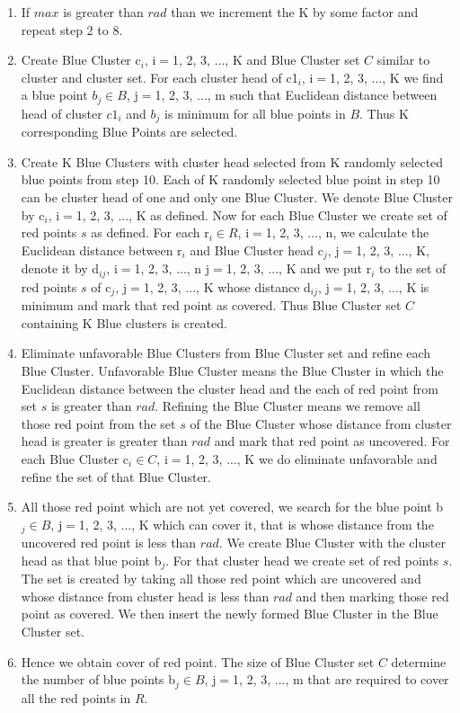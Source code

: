 \documentclass[12pt,a4wide]{report}
\theoremstyle{plain}
\theoremstyle{definition}
\theoremstyle{remark}
\begin{document}
\begin{enumerate}
 \item If $max$ is greater than $rad$ than we increment the K by some factor and repeat step 2 to 8.
 
 \item Create Blue Cluster c$_{i}$, i$=$1, 2, 3, ..., K and Blue Cluster set $C$ similar to cluster and cluster set. For each cluster head 
 of c1$_{i}$, i$=$1, 2, 3, ..., K we find a blue point $b_{j} \in B $, j$=$1, 2, 3, ..., m such that Euclidean distance between head of 
  cluster $c1_{i}$ and $b_{j}$ is minimum for all blue points in $B$. Thus K corresponding  Blue Points are selected.
  
 \item Create K Blue Clusters with cluster head selected from K randomly selected blue points from step 10. Each of K randomly selected blue point 
  in step 10 can be cluster head of one and only one Blue Cluster. We denote Blue Cluster by c$_{i}$, i$=$1, 2, 3, ..., K as defined. 
   Now for each Blue Cluster we create set of red points $s$ as defined. For each
  r$_{i} \in R$, i$=$1, 2, 3, ..., n, we calculate the Euclidean distance between r$_{i}$ and Blue Cluster head c$_{j}$, 
  j$=$1, 2, 3, ..., K, denote it by d$_{ij}$, i$=$1, 2, 3, ..., n j$=$1, 2, 3, ..., K  and we put r$_{i}$ to the set of red points $s$ of c$_{j}$, 
  j$=$1, 2, 3, ..., K 
  whose distance d$_{ij}$, j$=$1, 2, 3, ..., K is minimum and mark that red point as covered. Thus Blue Cluster set $C$ containing K Blue clusters 
  is created.
  
  \item Eliminate unfavorable Blue Clusters from Blue Cluster set and refine each Blue Cluster. Unfavorable Blue Cluster means 
  the Blue Cluster in which the Euclidean distance between the cluster head and the each of red point from set $s$ is greater than $rad$.
  Refining the Blue Cluster means we remove all those red point from the set $s$ of the Blue Cluster whose distance from cluster
  head is greater is greater than $rad$ and mark that red point as uncovered. For each Blue Cluster c$_{i} \in C$, i$=$1, 2, 3, ..., K
  we do eliminate unfavorable and refine the set of that Blue Cluster.
  
  \item All those red point which are not yet covered, we search for the blue point b$_{j} \in B$, j$=$1, 2, 3, ..., K
   which can cover it, that is  whose distance from the uncovered red point is less than $rad$. We create Blue Cluster with the cluster 
   head as that blue point b$_{j}$. For that cluster head we create
  set of red points $s$. The set is created by taking all those red point which are uncovered and whose distance from cluster
  head is less than $rad$ and then marking those red point as covered. We then insert the newly formed Blue Cluster in the Blue Cluster set.
  
  \item Hence we obtain cover of red point. The size of Blue Cluster set $C$ determine the number of blue points b$_{j} \in B$, j$=$1, 2, 3, ..., m
  that are required to cover all the red points in $R$.
  
   \end{enumerate}
\end{document}
